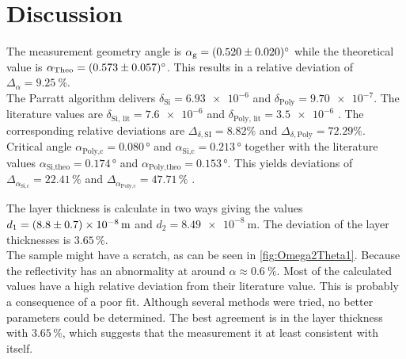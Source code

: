 \section{Discussion}
\label{sec:Diskussion}


The measurement geometry angle is $\alpha_\text{g} = \SI{0.520 \pm 0.020}{\degree}$ while the theoretical value is $\alpha_\text{Theo}  = \SI{0.573 \pm 0.057}{\degree}$.
This results in a relative deviation of $\Delta_\alpha = \SI{9.25}{\%}$.\\
The Parratt algorithm delivers $\delta_{\text{Si}}   =  \num{6.93e-6}$ and $\delta_\text{Poly}  =  \num{9.70e-7}$.
The literature values are $\delta_{\text{Si, lit}} = \num{7.6e-6}$ and $\delta_{\text{Poly, lit}} = \num{3.5e-6}$ \cite{v44}.
The corresponding relative deviations are $\Delta_{\delta, \text{SI}} = \num{8.82}{\%}$ and $\Delta_{\delta, \text{Poly}} = \num{72.29}{\%}$.\\
Critical angle $\alpha_{\text{Poly}, \text{c}} = 0.080 \, \unit{\degree}$ and $\alpha_{\text{Si}, \text{c}} = 0.213\, \unit{\degree}$ together with the literature values 
$\alpha_{\text{Si}, \text{theo}} = 0.174 \, \unit{\degree}$ and $\alpha_{\text{Poly}, \text{theo}} = 0.153 \, \unit{\degree}$.
This yields deviations of $\Delta_{\alpha_{\text{Si}, \text{c}}} = 22.41\,\%$ and $\Delta_{\alpha_{\text{Poly}, \text{c}}} = 47.71\,\%$ .


The layer thickness is calculate in two ways giving the values $d_1 = \SI{8.8 \pm 0.7e-08}{\meter}$ and $d_2 = \SI{8.49e-8}{\meter}$.
The deviation of the layer thicknesses is $3.65\, \%$.\\

The sample might have a scratch, as can be seen in \autoref{fig:Omega2Theta1}. Because the reflectivity has an abnormality at around $\alpha \approx \SI{0.6}{\%}$.
Most of the calculated values have a high relative deviation from their literature value. This is probably a consequence of a poor fit.
Although several methods were tried, no better parameters could be determined. The best agreement is in the layer thickness with $3.65\, \%$,
which suggests that the measurement it at least consistent with itself.
